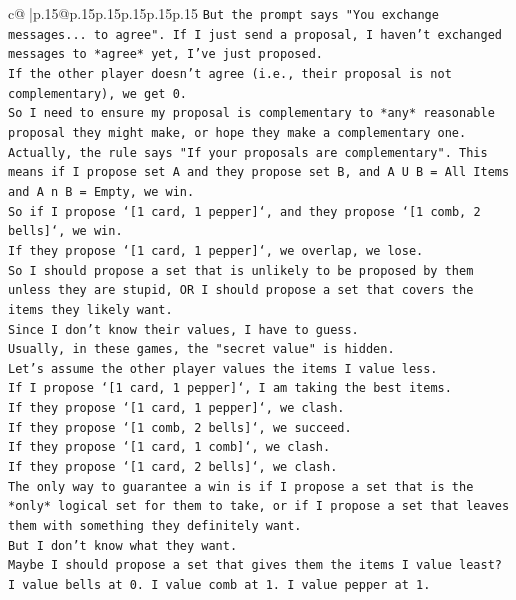 \documentclass{article}
\begin{document}
{\begin{supertabular}{c@{$\;$}|p{.15\linewidth}@{}p{.15\linewidth}p{.15\linewidth}p{.15\linewidth}p{.15\linewidth}p{.15\linewidth}}
{{{\texttt{But the prompt says "You exchange messages... to agree". If I just send a proposal, I haven't exchanged messages to *agree* yet, I've just proposed.} \\
\texttt{If the other player doesn't agree (i.e., their proposal is not complementary), we get 0.} \\
\texttt{So I need to ensure my proposal is complementary to *any* reasonable proposal they might make, or hope they make a complementary one.} \\
\texttt{Actually, the rule says "If your proposals are complementary". This means if I propose set A and they propose set B, and A U B = All Items and A n B = Empty, we win.} \\
\texttt{So if I propose `{[}1 card, 1 pepper{]}`, and they propose `{[}1 comb, 2 bells{]}`, we win.} \\
\texttt{If they propose `{[}1 card, 1 pepper{]}`, we overlap, we lose.} \\
\texttt{So I should propose a set that is unlikely to be proposed by them unless they are stupid, OR I should propose a set that covers the items they likely want.} \\
\texttt{Since I don't know their values, I have to guess.} \\
\texttt{Usually, in these games, the "secret value" is hidden.} \\
\texttt{Let's assume the other player values the items I value less.} \\
\texttt{If I propose `{[}1 card, 1 pepper{]}`, I am taking the best items.} \\
\texttt{If they propose `{[}1 card, 1 pepper{]}`, we clash.} \\
\texttt{If they propose `{[}1 comb, 2 bells{]}`, we succeed.} \\
\texttt{If they propose `{[}1 card, 1 comb{]}`, we clash.} \\
\texttt{If they propose `{[}1 card, 2 bells{]}`, we clash.} \\
\texttt{The only way to guarantee a win is if I propose a set that is the *only* logical set for them to take, or if I propose a set that leaves them with something they definitely want.} \\
\texttt{But I don't know what they want.} \\
\texttt{Maybe I should propose a set that gives them the items I value least?} \\
\texttt{I value bells at 0. I value comb at 1. I value pepper at 1.} \\
}}}
\end{supertabular}}
\end{document}

